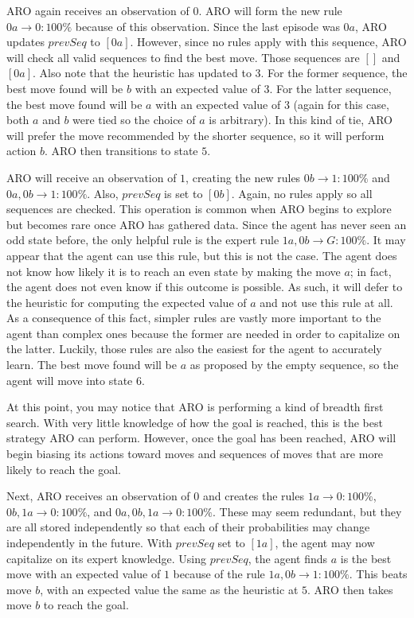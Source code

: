 \documentclass[letterpaper]{article} %
\begin{document}
ARO again receives an observation of $0$. ARO will form the new rule $0a \rightarrow 0: 100\%$ because of this observation. Since the last episode was $0a$, ARO updates $prevSeq$ to $[0a]$. However, since no rules apply with this sequence, ARO will check all valid sequences to find the best move. Those sequences are $[]$ and $[0a]$. Also note that the heuristic has updated to $3$. For the former sequence, the best move found will be $b$ with an expected value of $3$. For the latter sequence, the best move found will be $a$ with an expected value of $3$ (again for this case, both $a$ and $b$ were tied so the choice of $a$ is arbitrary). In this kind of tie, ARO will prefer the move recommended by the shorter sequence, so it will perform action $b$. ARO then transitions to state $5$.

ARO will receive an observation of $1$, creating the new rules $0b \rightarrow 1: 100\%$ and $0a, 0b \rightarrow 1: 100\%$. Also, $prevSeq$ is set to $[0b]$. Again, no rules apply so all sequences are checked. This operation is common when ARO begins to explore but becomes rare once ARO has gathered data. Since the agent has never seen an odd state before, the only helpful rule is the expert rule $1a, 0b \rightarrow G: 100\%$. It may appear that the agent can use this rule, but this is not the case. The agent does not know how likely it is to reach an even state by making the move $a$; in fact, the agent does not even know if this outcome is possible. As such, it will defer to the heuristic for computing the expected value of $a$ and not use this rule at all. As a consequence of this fact, simpler rules are vastly more important to the agent than complex ones because the former are needed in order to capitalize on the latter. Luckily, those rules are also the easiest for the agent to accurately learn. The best move found will be $a$ as proposed by the empty sequence, so the agent will move into state $6$.

At this point, you may notice that ARO is performing a kind of breadth first search. With very little knowledge  of how the goal is reached, this is the best strategy ARO can perform. However, once the goal has been reached, ARO will begin biasing its actions toward moves and sequences of moves that are more likely to reach the goal. 

Next, ARO receives an observation of $0$ and creates the rules $1a \rightarrow 0: 100\%$, $0b, 1a \rightarrow 0: 100\%$, and $0a, 0b, 1a \rightarrow 0: 100\%$. These may seem redundant, but they are all stored independently so that each of their probabilities may change independently in the future. With $prevSeq$ set to $[1a]$, the agent may now capitalize on its expert knowledge. Using $prevSeq$, the agent finds $a$ is the best move with an expected value of $1$ because of the rule $1a, 0b \rightarrow 1: 100\%$. This beats move $b$, with an expected value the same as the heuristic at $5$. ARO then takes move $b$ to reach the goal.
\end{document}
